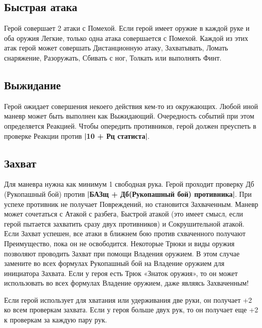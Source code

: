 \subsection{Быстрая атака}
Герой совершает 2 атаки с Помехой. Если герой имеет оружие в каждой руке и оба оружия Легкие, только одна атака совершается с Помехой. Каждой из этих атак герой может совершать Дистанционную атаку, Захватывать, Ломать снаряжение, Разоружать, Сбивать с ног, Толкать или выполнять Финт.
\subsection{Выжидание}
Герой ожидает совершения некоего действия кем-то из окружающих. Любой иной маневр может быть выполнен как Выжидающий.
\newline
Очередность событий при этом определяется Реакцией. Чтобы
опередить противников, герой должен преуспеть в проверке
Реакции против \textbf{|10 + Рц статиста|}.
\subsection{Захват}
Для маневра нужна как минимум 1 свободная рука. Герой проходит проверку Дб (Рукопашный бой) против \textbf{|БАЗщ + Дб(Рукопашный бой) противника|}. При успехе противник не получает Повреждений, но становится Захваченным. Маневр может сочетаться с Атакой с разбега, Быстрой атакой (это имеет смысл, если герой пытается захватить сразу двух
противников) и Сокрушительной атакой. Если Захват успешен, все атаки в ближнем бою против схваченного получают Преимущество, пока он не освободится. Некоторые Трюки и виды оружия позволяют проводить Захват при помощи Владения оружием. В этом случае замените во всех формулах Рукопашный бой на Владение оружием для инициатора Захвата. Если у героя есть Трюк «Знаток оружия», то он может использовать во всех формулах Владение оружием, даже являясь Захваченным!
\begin{tcolorbox}
Если герой использует для хватания или удерживания две руки, он получает +2 ко всем проверкам захвата. Если у героя больше двух рук, то он получает еще +2 к проверкам за каждую пару рук.
\end{tcolorbox}
